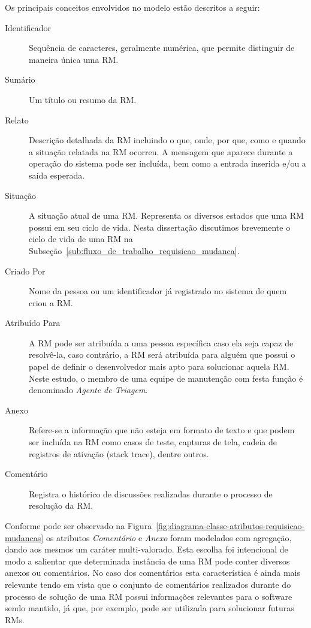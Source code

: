 Os principais conceitos envolvidos no modelo estão descritos a seguir:

\begin{description}
	\item [Identificador] Sequência de caracteres,  geralmente numérica,  que
		permite distinguir de maneira única uma RM\@.
	\item [Sumário] Um título ou resumo da RM\@.
	\item [Relato] Descrição detalhada da RM incluindo o que, onde, por que,
		como e quando a situação relatada na RM ocorreu. A mensagem que aparece
		durante a operação do sistema pode ser incluída, bem como a entrada
		inserida e/ou a saída esperada.
	\item [Situação] A situação atual de uma RM\@. Representa os diversos
		estados que uma RM possui em seu ciclo de vida. Nesta dissertação
		discutimos brevemente o ciclo de vida de uma RM na
		Subseção~\ref{sub:fluxo_de_trabalho_requisicao_mudanca}.
	\item [Criado Por] Nome da pessoa ou um identificador já registrado no
		sistema de quem criou a RM\@.
	\item [Atribuído Para] A RM pode ser atribuída a uma pessoa específica caso
		ela seja capaz de resolvê-la, caso contrário, a RM será atribuída para
		alguém que possui o papel de definir o desenvolvedor mais apto para
		solucionar aquela RM\@. Neste estudo, o membro de uma equipe de manutenção
		com festa função é denominado \textit{Agente de Triagem}.
	\item [Anexo] Refere-se a informação que não esteja em formato de texto e
		que podem ser incluída na RM como casos de teste, capturas de tela,
		cadeia de registros de ativação (stack trace), dentre outros.
	\item [Comentário] Registra o histórico de discussões realizadas durante o
		processo de resolução da RM\@.
\end{description}


Conforme pode ser observado na
Figura~\ref{fig:diagrama-classe-atributos-requisicao-mudancas} os atributos
\textit{Comentário} e \textit{Anexo} foram modelados com agregação, dando aos
mesmos um caráter multi-valorado. Esta escolha foi intencional de modo a
salientar que determinada instância de uma RM pode conter diversos anexos ou
comentários. No caso dos comentários esta característica é ainda mais relevante
tendo em vista que o conjunto de comentários realizados durante do processo de
solução de uma RM possui informações relevantes para o software sendo mantido,
já que, por exemplo, pode ser utilizada para solucionar futuras RMs.

